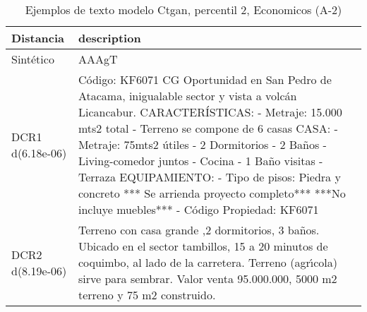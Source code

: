 \begin{table}[H]
\centering
\fontsize{10}{14}\selectfont
\caption{Ejemplos de texto modelo Ctgan, percentil 2, Economicos (A-2)}
\label{table-example-economicos-a-2-ctgan-2p-text}
\begin{tabular}{|l|m{35em}|}
\hline
\rowcolor[gray]{0.8}
Distancia & description \\
\hline Sintético & AAAgT \\
\hline DCR1 d(6.18e-06) & C\'odigo: KF6071 CG  Oportunidad en San Pedro de Atacama, inigualable sector y vista a volc\'an Licancabur.  CARACTER\'ISTICAS: - Metraje: 15.000 mts2 total - Terreno se compone de 6 casas  CASA: -Metraje:  75mts2 \'utiles - 2 Dormitorios - 2 Ba\~nos - Living-comedor juntos - Cocina - 1 Ba\~no visitas - Terraza  EQUIPAMIENTO: - Tipo de pisos: Piedra y concreto   *** Se arrienda proyecto completo*** ***No incluye muebles*** - C\'odigo Propiedad: KF6071 \\
\hline DCR2 d(8.19e-06) & Terreno con casa grande ,2 dormitorios, 3 ba\~nos. Ubicado en el sector tambillos, 15 a 20 minutos de coquimbo, al lado de la carretera. Terreno (agr{\'\i}cola) sirve para sembrar. Valor venta 95.000.000, 5000 m2 terreno y 75 m2 construido. \\
\hline
\end{tabular}
\end{table}
